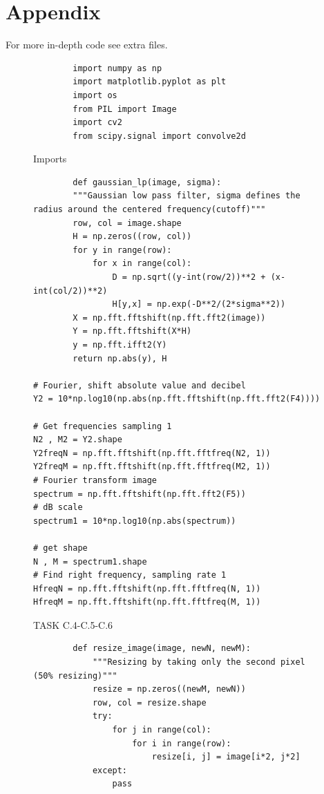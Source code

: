 {%
\newpage
\clearpage
\section{Appendix}
For more in-depth code see extra files.

\begin{figure}[H]
    \begin{lstlisting}
        import numpy as np 
        import matplotlib.pyplot as plt
        import os
        from PIL import Image
        import cv2
        from scipy.signal import convolve2d
    \end{lstlisting}
\caption{Imports}
\label{Imports}
\end{figure}


\begin{figure}[H]
    \begin{lstlisting}
        def gaussian_lp(image, sigma):
        """Gaussian low pass filter, sigma defines the radius around the centered frequency(cutoff)"""
        row, col = image.shape
        H = np.zeros((row, col))
        for y in range(row):
            for x in range(col):
                D = np.sqrt((y-int(row/2))**2 + (x-int(col/2))**2)
                H[y,x] = np.exp(-D**2/(2*sigma**2))
        X = np.fft.fftshift(np.fft.fft2(image))
        Y = np.fft.fftshift(X*H)
        y = np.fft.ifft2(Y)
        return np.abs(y), H

# Fourier, shift absolute value and decibel 
Y2 = 10*np.log10(np.abs(np.fft.fftshift(np.fft.fft2(F4))))

# Get frequencies sampling 1
N2 , M2 = Y2.shape
Y2freqN = np.fft.fftshift(np.fft.fftfreq(N2, 1))
Y2freqM = np.fft.fftshift(np.fft.fftfreq(M2, 1))
# Fourier transform image
spectrum = np.fft.fftshift(np.fft.fft2(F5))
# dB scale
spectrum1 = 10*np.log10(np.abs(spectrum))

# get shape
N , M = spectrum1.shape
# Find right frequency, sampling rate 1
HfreqN = np.fft.fftshift(np.fft.fftfreq(N, 1))
HfreqM = np.fft.fftshift(np.fft.fftfreq(M, 1))
    \end{lstlisting}
\caption{TASK C.4-C.5-C.6}
\label{TASK C.4-C.5-C.6}
\end{figure}

\begin{figure}[H]
    \begin{lstlisting}
        def resize_image(image, newN, newM):
            """Resizing by taking only the second pixel (50% resizing)"""
            resize = np.zeros((newM, newN))
            row, col = resize.shape
            try:
                for j in range(col):
                    for i in range(row):
                        resize[i, j] = image[i*2, j*2]
            except:
                pass
        

\end{lstlisting}
\end{figure}}
